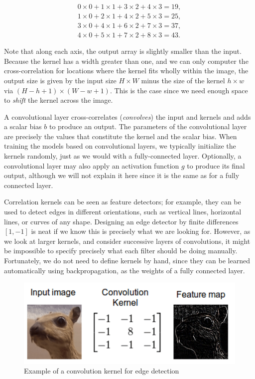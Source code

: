 \begin{align*}
0 \times 0+1 \times 1+3 \times 2+4 \times 3=19,\\
1 \times 0+2 \times 1+4 \times 2+5 \times 3=25,\\
3 \times 0+4 \times 1+6 \times 2+7 \times 3=37,\\
4 \times 0+5 \times 1+7 \times 2+8 \times 3=43.
\end{align*}

Note that along each axis, the output array is slightly smaller than the input. Because the kernel has a width greater than one, and we can only computer the cross-correlation for locations where the kernel fits wholly within the image, the output size is given by the input size $H \times W$  minus the size of the kernel $h \times w$ via $(H-h+1)\times(W-w+1)$. This is the case since we need enough space to \textit{shift} the kernel across the image.

A convolutional layer cross-correlates (\textit{convolves}) the input and kernels and adds a scalar bias $b$ to produce an output. The parameters of the convolutional layer are precisely the values that constitute the kernel and the scalar bias. When training the models based on convolutional layers, we typically initialize the kernels randomly, just as we would with a fully-connected layer. Optionally, a convolutional layer may also apply an activation function $g$ to produce its final output, although we will not explain it here since it is the same as for a fully connected layer.

Correlation kernels can be seen as feature detectors; for example, they can be used to detect edges in different orientations, such as vertical lines, horizontal lines, or curves of any shape. Designing an edge detector by finite differences $[1, -1]$ is neat if we know this is precisely what we are looking for. However, as we look at larger kernels, and consider successive layers of convolutions, it might be impossible to specify precisely what each filter should be doing manually. Fortunately, we do not need to define kernels by hand, since they can be learned automatically using backpropagation, as the weights of a fully connected layer.

\begin{figure}[hpt]
    \centering
    \includegraphics[scale=0.5]{images/app/edge-detection.png}
    \caption{Example of a convolution kernel for edge detection}
    \label{fig:edge-detection}
\end{figure}

